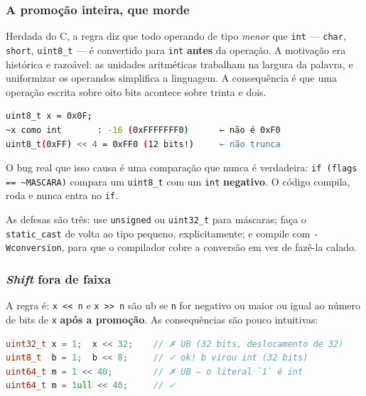 \subsubsection{A promoção inteira, que morde}

\begin{porque}
Herdada do C, a regra diz que todo operando de tipo \emph{menor} que
\texttt{int} --- \texttt{char}, \texttt{short}, \texttt{uint8\_t} --- é
convertido para \texttt{int} \textbf{antes} da operação. A motivação era
histórica e razoável: as unidades aritméticas trabalham na largura da palavra, e
uniformizar os operandos simplifica a linguagem. A consequência é que uma
operação escrita sobre oito bits acontece sobre trinta e dois.
\end{porque}

\begin{lstlisting}[style=bt, language=bash,
    caption={Saída de \texttt{src/bits/}: a promoção, medida.}]
uint8_t x = 0x0F;
~x como int       : -16 (0xFFFFFFF0)      ← não é 0xF0
uint8_t(0xFF) << 4 = 0xFF0 (12 bits!)     ← não trunca
\end{lstlisting}

O bug real que isso causa é uma comparação que nunca é verdadeira:
\texttt{if (flags == \textasciitilde MASCARA)} compara um \texttt{uint8\_t} com
um \texttt{int} \textbf{negativo}. O código compila, roda e nunca entra no
\texttt{if}.

As defesas são três: use \texttt{unsigned} ou \texttt{uint32\_t} para máscaras;
faça o \texttt{static\_cast} de volta ao tipo pequeno, explicitamente; e compile
com \texttt{-Wconversion}, para que o compilador cobre a conversão em vez de
fazê-la calado.

\subsubsection{\emph{Shift} fora de faixa}

A regra é: \texttt{x << n} e \texttt{x >> n} são \gls{ub} se \texttt{n} for
negativo ou maior ou igual ao número de bits de \texttt{x} \textbf{após a
promoção}. As consequências são pouco intuitivas:

\begin{lstlisting}[style=bt, language=C++,
    caption={Quatro deslocamentos: dois corretos, dois \gls{ub}.}]
uint32_t x = 1;  x << 32;    // ✗ UB (32 bits, deslocamento de 32)
uint8_t  b = 1;  b << 8;     // ✓ ok! b virou int (32 bits)
uint64_t m = 1 << 40;        // ✗ UB — o literal `1` é int
uint64_t m = 1ull << 40;     // ✓
\end{lstlisting}

